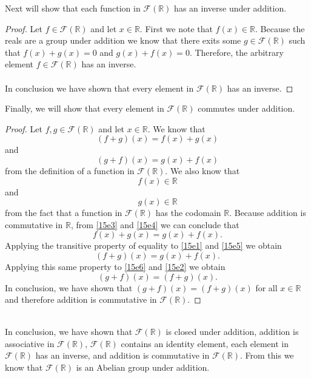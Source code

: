 \documentclass[11pt,a4paper]{article}
\begin{document}
Next will show that each function in $\mathcal{F}(\mathbb{R})$ has an inverse under addition.
\begin{proof}
Let $f\in\mathcal{F}(\mathbb{R})$ and let $x\in\mathbb{R}$. First we note that $f(x)\in\mathbb{R}$. Because the reals are a group under addition we know that there exits some $g\in\mathcal{F}(\mathbb{R})$ such that $f(x)+g(x)=0$ and $g(x)+f(x)=0$. Therefore, the arbitrary element $f\in\mathcal{F}(\mathbb{R})$ has an inverse.\\
~\\
In conclusion we have shown that every element in $\mathcal{F}(\mathbb{R})$ has an inverse.
\end{proof}
Finally, we will show that every element in $\mathcal{F}(\mathbb{R})$ commutes under addition.
\begin{proof}
Let $f,g\in\mathcal{F}(\mathbb{R})$ and let $x\in\mathbb{R}$. We know that
\begin{equation}\label{15e1}
(f+g)(x)= f(x)+g(x)
\end{equation}
and
\begin{equation}\label{15e2}
(g+f)(x)=g(x)+f(x)
\end{equation}
from the definition of a function in $\mathcal{F}(\mathbb{R})$. We also know that
\begin{equation}\label{15e3}
f(x)\in\mathbb{R}
\end{equation}
and
\begin{equation}\label{15e4}
g(x)\in\mathbb{R}
\end{equation}
from the fact that a function in $\mathcal{F}(\mathbb{R})$ has the codomain $\mathbb{R}$. Because addition is commutative in $\mathbb{R}$, from \eqref{15e3} and \eqref{15e4} we can conclude that
\begin{equation}\label{15e5}
f(x)+g(x)=g(x)+f(x).
\end{equation}
Applying the transitive property of equality to \eqref{15e1} and \eqref{15e5} we obtain
\begin{equation}\label{15e6}
(f+g)(x)=g(x)+f(x).
\end{equation}
Applying this same property to \eqref{15e6} and \eqref{15e2} we obtain
\[(g+f)(x)=(f+g)(x).\]
In conclusion, we have shown that $(g+f)(x)=(f+g)(x)$ for all $x\in\mathbb{R}$ and therefore addition is commutative in $\mathcal{F}(\mathbb{R})$.
\end{proof}
~\\
In conclusion, we have shown that $\mathcal{F}(\mathbb{R})$ is closed under addition, addition is associative in $\mathcal{F}(\mathbb{R})$, $\mathcal{F}(\mathbb{R})$ contains an identity element, each element in $\mathcal{F}(\mathbb{R})$ has an inverse, and addition is commutative in $\mathcal{F}(\mathbb{R})$. From this we know that $\mathcal{F}(\mathbb{R})$ is an Abelian group under addition.\\
\end{document}
